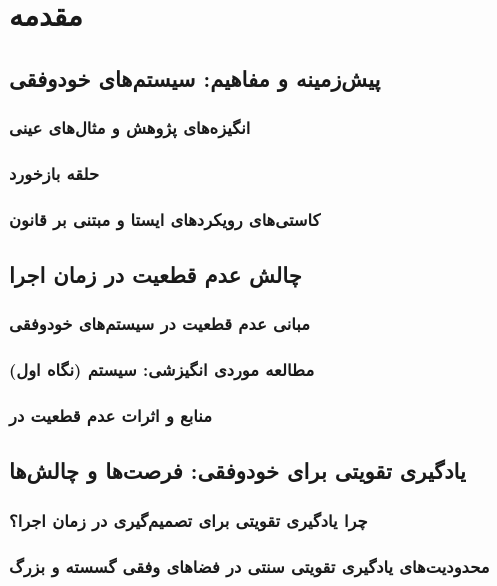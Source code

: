 \documentclass[12pt,a4paper]{report} %
\begin{document}
\chapter{مقدمه}

\section{پیش‌زمینه و مفاهیم: سیستم‌های خودوفقی}
\subsection{انگیزه‌های پژوهش و مثال‌های عینی}
\subsection{حلقه بازخورد }
\subsection{کاستی‌های رویکردهای ایستا و مبتنی بر قانون}

\section{چالش عدم قطعیت در زمان اجرا}
\subsection{مبانی عدم قطعیت در سیستم‌های خودوفقی}
\subsection{مطالعه موردی انگیزشی: سیستم  (نگاه اول)}
\subsection{منابع و اثرات عدم قطعیت در }

\section{یادگیری تقویتی برای خودوفقی: فرصت‌ها و چالش‌ها}
\subsection{چرا یادگیری تقویتی برای تصمیم‌گیری در زمان اجرا؟}
\subsection{محدودیت‌های یادگیری تقویتی سنتی در فضاهای وفقی گسسته و بزرگ}
\end{document}

